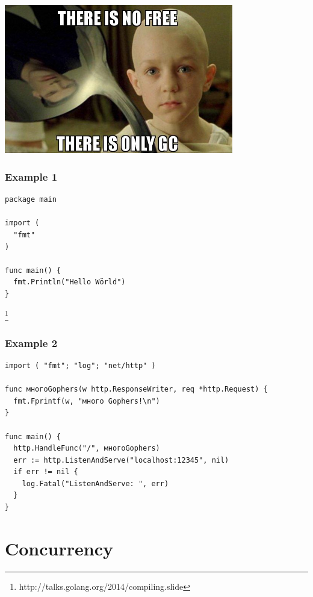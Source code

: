 \documentclass[xelatex,aspectratio=169]{beamer}
\newcommand\blfootnote[1]{%
	\begingroup
	\renewcommand\thefootnote{}\footnote{#1}%
	\endgroup
}
\begin{document}
\begin{frame}
	\centerline{\includegraphics[width=0.75\textwidth]{images/nofree.jpg}}
\end{frame}

\begin{frame}[fragile]
	\frametitle{Example  1}
\begin{verbatim}
package main

import (
  "fmt"
)

func main() {
  fmt.Println("Hello Wörld")
}
\end{verbatim}
\end{frame}

\begin{frame}
	\begin{fancyquote}
	\end{fancyquote}
	\blfootnote{http://talks.golang.org/2014/compiling.slide}
\end{frame}

\begin{frame}[fragile]
	\frametitle{Example  2}
\begin{verbatim}
import ( "fmt"; "log"; "net/http" )

func многоGophers(w http.ResponseWriter, req *http.Request) {
  fmt.Fprintf(w, "много Gophers!\n")
}

func main() {
  http.HandleFunc("/", многоGophers)
  err := http.ListenAndServe("localhost:12345", nil)
  if err != nil {
    log.Fatal("ListenAndServe: ", err)
  }
}
\end{verbatim}
\end{frame}

\section[]{Concurrency}
\frame{\sectionpage}
\end{document}
